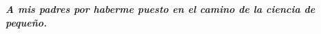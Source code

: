 \vspace*{1.5in}
\begin{flushright}
		\begin{minipage}[b]{5in}
				\Large\bfseries\emph{A mis padres por haberme puesto en el camino de la ciencia de peque\~no.}
		\end{minipage}
\end{flushright}

